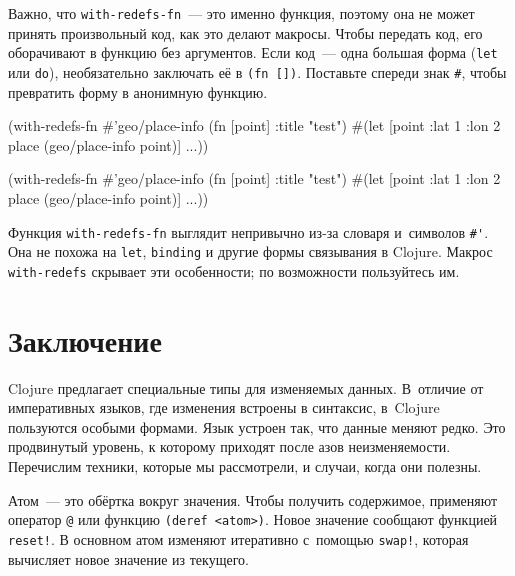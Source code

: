 \fi


Важно, что \verb|with-redefs-fn|~--- это именно функция, поэтому она не может
принять произвольный код, как это делают макросы. Чтобы передать код, его
оборачивают в функцию без аргументов. Если код~--- одна большая форма
(\verb|let| или \verb|do|), необязательно заключать её в
\verb|(fn [])|. Поставьте спереди знак \verb|#|, чтобы превратить форму в
анонимную функцию.

\ifnarrow

\begin{english}
  \begin{clojure}
(with-redefs-fn
  {#'geo/place-info (fn [point]
                      {:title "test"})}
  #(let [point {:lat 1 :lon 2}
         place (geo/place-info point)]
     ...))
  \end{clojure}
\end{english}

\else

\begin{english}
  \begin{clojure}
(with-redefs-fn
  {#'geo/place-info (fn [point] {:title "test"})}
  #(let [point {:lat 1 :lon 2}
         place (geo/place-info point)]
     ...))
  \end{clojure}
\end{english}

\fi

Функция \verb|with-redefs-fn| выглядит непривычно из-за словаря и~символов
\verb|#'|. Она не похожа на \verb|let|, \verb|binding| и другие формы
связывания в Clojure. Макрос \verb|with-redefs| скрывает эти особенности; по
возможности пользуйтесь им.

\section{Заключение}

Clojure предлагает специальные типы для изменяемых данных. В~отличие от
императивных языков, где изменения встроены в синтаксис, в~Clojure пользуются
особыми формами. Язык устроен так, что данные меняют редко. Это продвинутый
уровень, к которому приходят после азов неизменяемости. Перечислим техники,
которые мы рассмотрели, и случаи, когда они полезны.

Атом~--- это обёртка вокруг значения. Чтобы получить содержимое, применяют
оператор \verb|@| или функцию \verb|(deref <atom>)|. Новое значение сообщают
функцией \verb|reset!|. В основном атом изменяют итеративно с~помощью
\verb|swap!|, которая вычисляет новое значение из текущего.

